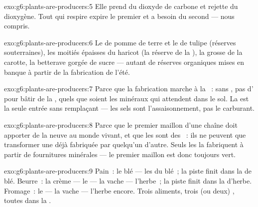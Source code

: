 \begin{solution}{exo:g6:plants-are-producers:5}
Elle prend du dioxyde de carbone et rejette du dioxygène. Tout  qui respire expire le premier et a besoin du second --- nous
compris.
\end{solution}

\begin{solution}{exo:g6:plants-are-producers:6}
Le  de pomme de terre et le  de tulipe (réserves
souterraines), les moitiés épaisses du haricot (la réserve de la
), la grosse  de la carotte, la betterave gorgée de
sucre --- autant de réserves organiques mises en banque à partir de
la fabrication de l'été.
\end{solution}

\begin{solution}{exo:g6:plants-are-producers:7}
Parce que la fabrication marche à la ~: sans , pas
d' pour bâtir de la , quels que soient les
minéraux qui attendent dans le sol. La  est la seule entrée
sans remplaçant --- les sels sont l'assaisonnement, pas le
carburant.
\end{solution}

\begin{solution}{exo:g6:plants-are-producers:8}
Parce que le premier maillon d'une chaîne doit apporter de la
 neuve au monde vivant, et que les  sont des
~: ils ne peuvent que transformer une 
déjà fabriquée par quelqu'un d'autre. Seuls les  la
fabriquent à partir de fournitures minérales --- le premier maillon
est donc toujours vert.
\end{solution}

\begin{solution}{exo:g6:plants-are-producers:9}
Pain~: le blé --- les  du blé~; la piste finit dans la
 de blé. Beurre~: la crème --- le  --- la vache ---
l'herbe~; la piste finit dans la  d'herbe. Fromage~: le 
--- la vache --- l'herbe encore. Trois aliments, trois (ou deux)
, toutes dans la .
\end{solution}


